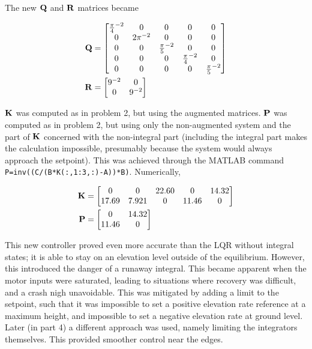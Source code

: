 The new $\mathbf{Q}$ and $\mathbf{R}$ matrices became

\begin{subequations}
	 \begin{align}
	   \mathbf{Q} &= \begin{bmatrix}
	   	\frac{\pi}{4}^{-2} & 0 & 0 & 0 & 0\\
	   	0 & 2\pi^{-2} & 0 & 0 & 0\\
	   	0&0& \frac{\pi}{5}^{-2} & 0 & 0\\
	   	0&0&0& \frac{\pi}{4}^{-2} & 0\\
	   	0&0&0&0& \frac{\pi}{5}^{-2} \\
	   \end{bmatrix}\\
	   \mathbf{R} &= \begin{bmatrix}
	   	9^{-2} & 0 \\
	   	0 & 9^{-2}
	   \end{bmatrix}
	 \end{align}
\end{subequations}

$\mathbf{K}$ was computed as in problem 2, but using the augmented matrices. $\mathbf{P}$ was computed as in problem 2, but using only the non-augmented system and the part of $\mathbf{K}$ concerned with the non-integral part (including the integral part makes the calculation impossible, presumably because the system would always approach the setpoint). This was achieved through the MATLAB command \texttt{P=inv((C/(B*K(:,1:3,:)-A))*B)}. Numerically, 

\begin{subequations}
	 \begin{align}
	   \mathbf{K} &= \begin{bmatrix}
	   	0		&0		&22.60	&0		&14.32 \\
		17.69	&7.921	&0		&11.46	&0
	   \end{bmatrix} \\
	   \mathbf{P} &= \begin{bmatrix}
	   	0&	14.32 \\
		11.46&	0
	   \end{bmatrix}
	 \end{align}
\end{subequations}

This new controller proved even more accurate than the LQR without integral states; it is able to stay on an elevation level outside of the equilibrium. However, this introduced the danger of a runaway integral. This became apparent when the motor inputs were saturated, leading to situations where recovery was difficult, and a crash nigh unavoidable. This was mitigated by adding a limit to the setpoint, such that it was impossible to set a positive elevation rate reference at a maximum height, and impossible to set a negative elevation rate at ground level. Later (in part 4) a different approach was used, namely limiting the integrators themselves. This provided smoother control near the edges.